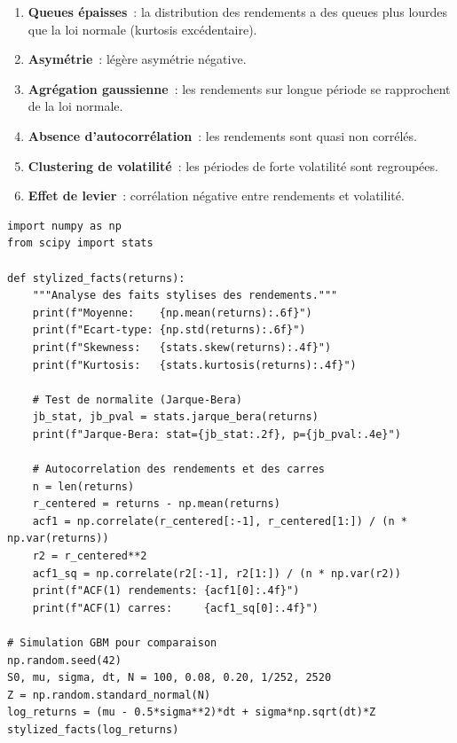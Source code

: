 \begin{enumerate}
    \item \textbf{Queues \'epaisses}~: la distribution des rendements a des
          queues plus lourdes que la loi normale (kurtosis exc\'edentaire).
    \item \textbf{Asym\'etrie}~: l\'eg\`ere asym\'etrie n\'egative.
    \item \textbf{Agr\'egation gaussienne}~: les rendements sur longue
          p\'eriode se rapprochent de la loi normale.
    \item \textbf{Absence d'autocorr\'elation}~: les rendements sont
          quasi non corr\'el\'es.
    \item \textbf{Clustering de volatilit\'e}~: les p\'eriodes de forte
          volatilit\'e sont regroup\'ees.
    \item \textbf{Effet de levier}~: corr\'elation n\'egative entre
          rendements et volatilit\'e.
\end{enumerate}

\begin{codeblock}[title=\textbf{Analyse des faits stylis\'es}]
\begin{verbatim}
import numpy as np
from scipy import stats

def stylized_facts(returns):
    """Analyse des faits stylises des rendements."""
    print(f"Moyenne:    {np.mean(returns):.6f}")
    print(f"Ecart-type: {np.std(returns):.6f}")
    print(f"Skewness:   {stats.skew(returns):.4f}")
    print(f"Kurtosis:   {stats.kurtosis(returns):.4f}")

    # Test de normalite (Jarque-Bera)
    jb_stat, jb_pval = stats.jarque_bera(returns)
    print(f"Jarque-Bera: stat={jb_stat:.2f}, p={jb_pval:.4e}")

    # Autocorrelation des rendements et des carres
    n = len(returns)
    r_centered = returns - np.mean(returns)
    acf1 = np.correlate(r_centered[:-1], r_centered[1:]) / (n * np.var(returns))
    r2 = r_centered**2
    acf1_sq = np.correlate(r2[:-1], r2[1:]) / (n * np.var(r2))
    print(f"ACF(1) rendements: {acf1[0]:.4f}")
    print(f"ACF(1) carres:     {acf1_sq[0]:.4f}")

# Simulation GBM pour comparaison
np.random.seed(42)
S0, mu, sigma, dt, N = 100, 0.08, 0.20, 1/252, 2520
Z = np.random.standard_normal(N)
log_returns = (mu - 0.5*sigma**2)*dt + sigma*np.sqrt(dt)*Z
stylized_facts(log_returns)
\end{verbatim}
\end{codeblock}


